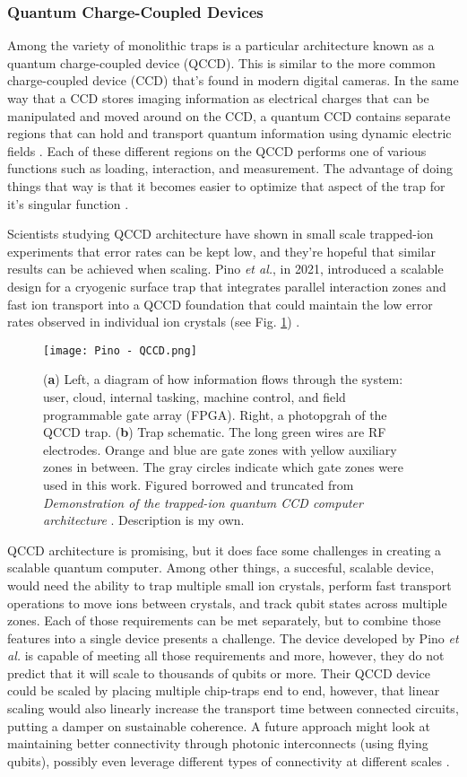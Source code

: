 \subsubsection{Quantum Charge-Coupled Devices}
Among the variety of monolithic traps is a particular architecture known as a quantum charge-coupled device (QCCD). This is similar to the more common charge-coupled device (CCD) that's found in modern digital cameras. In the same way that a CCD stores imaging information as electrical charges that can be manipulated and moved around on the CCD, a quantum CCD contains separate regions that can hold and transport quantum information using dynamic electric fields \cite{Pino}. Each of these different regions on the QCCD performs one of various functions such as loading, interaction, and measurement. The advantage of doing things that way is that it becomes easier to optimize that aspect of the trap for it's singular function \cite{Bruzewicz}.

Scientists studying QCCD architecture have shown in small scale trapped-ion experiments that error rates can be kept low, and they're hopeful that similar results can be achieved when scaling. Pino \textit{et al.}, in 2021, introduced a scalable design for a cryogenic surface trap that integrates parallel interaction zones and fast ion transport into a QCCD foundation that could maintain the low error rates observed in individual ion crystals (see Fig. \ref{fig:QCCD}) \cite{Pino}.
\begin{figure}[h]
    \texttt{[image: Pino - QCCD.png]}
    \caption{(\textbf{a}) Left, a diagram of how information flows through the system: user, cloud, internal tasking, machine control, and field programmable gate array (FPGA). Right, a photopgrah of the QCCD trap. (\textbf{b}) Trap schematic. The long green wires are RF electrodes. Orange and blue are gate zones with yellow auxiliary zones in between. The gray circles indicate which gate zones were used in this work. Figured borrowed and truncated from \textit{Demonstration of the trapped-ion quantum CCD computer architecture} \cite{Pino}. Description is my own.}
    \label{fig:QCCD}
\end{figure}

QCCD architecture is promising, but it does face some challenges in creating a scalable quantum computer. Among other things, a succesful, scalable device, would need the ability to trap multiple small ion crystals, perform fast transport operations to move ions between crystals, and track qubit states across multiple zones. Each of those requirements can be met separately, but to combine those features into a single device presents a challenge. The device developed by Pino \textit{et al.} is capable of meeting all those requirements and more, however, they do not predict that it will scale to thousands of qubits or more. Their QCCD device could be scaled by placing multiple chip-traps end to end, however, that linear scaling would also linearly increase the transport time between connected circuits, putting a damper on sustainable coherence. A future approach might look at maintaining better connectivity through photonic interconnects (using flying qubits), possibly even leverage different types of connectivity at different scales \cite{Pino}.
